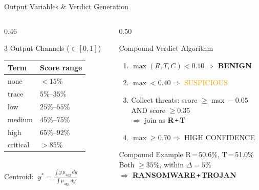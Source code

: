 \documentclass[aspectratio=169,12pt]{beamer}
\newcommand{\R}[1]{\textcolor{accent-r}{\textbf{#1}}}
\newcommand{\T}[1]{\textcolor{accent-t}{\textbf{#1}}}
\newcommand{\G}[1]{\textcolor{accent-g}{\textbf{#1}}}
\begin{document}
\begin{frame}{Output Variables \& Verdict Generation}
  \begin{columns}[T]
    \begin{column}{0.46\textwidth}
      \begin{block}{3 Output Channels ($\in[0,1]$)}
        \footnotesize
        \setlength{\tabcolsep}{4pt}
        \renewcommand{\arraystretch}{1.15}
        \begin{tabular}{@{} l l @{}}
          \toprule
          \textbf{Term} & \textbf{Score range} \\
          \midrule
          none     & $< 15\%$ \\
          trace    & $5\%$–$35\%$ \\
          low      & $25\%$–$55\%$ \\
          medium   & $45\%$–$75\%$ \\
          high     & $65\%$–$92\%$ \\
          critical & $> 85\%$ \\
          \bottomrule
        \end{tabular}\\[0.4em]
        \footnotesize Centroid: $\;y^* = \tfrac{\int y\,\mu_{\text{agg}}\,dy}{\int \mu_{\text{agg}}\,dy}$
      \end{block}
    \end{column}
    \begin{column}{0.50\textwidth}
      \begin{alertblock}{Compound Verdict Algorithm}
        \footnotesize
        \begin{enumerate}\setlength{\itemsep}{1pt}
          \item $\max(R,T,C) < 0.10 \Rightarrow$ \G{BENIGN}
          \item $\max < 0.40 \Rightarrow$ \textcolor{orange}{SUSPICIOUS}
          \item Collect threats: score $\geq \max{-}0.05$\\
                AND score $\geq 0.35$\\
                $\Rightarrow$ join as \R{R}\,\texttt{+}\,\T{T}
          \item $\max \geq 0.70 \Rightarrow$ HIGH CONFIDENCE
        \end{enumerate}
      \end{alertblock}
      \vspace{0.3em}
      \begin{exampleblock}{Compound Example}
        \footnotesize
        R\,=\,50.6\%,\; T\,=\,51.0\%\\
        Both $\geq 35\%$, within $\Delta\!=\!5\%$\\
        $\Rightarrow$ \R{RANSOMWARE}\,\texttt{+}\,\T{TROJAN}
      \end{exampleblock}
    \end{column}
  \end{columns}
\end{frame}
\end{document}
